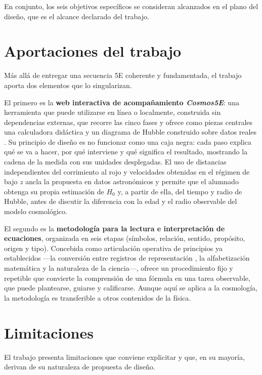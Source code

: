 En conjunto, los seis objetivos específicos se consideran alcanzados en el plano del diseño, que es el alcance declarado del trabajo.

\section{Aportaciones del trabajo}

Más allá de entregar una secuencia 5E coherente y fundamentada, el trabajo aporta dos elementos que lo singularizan.

El primero es la \textbf{web interactiva de acompañamiento \textit{Cosmos5E}}: una herramienta que puede utilizarse en línea o localmente, construida sin dependencias externas, que recorre las cinco fases y ofrece como piezas centrales una calculadora didáctica y un diagrama de Hubble construido sobre datos reales \parencite{steer2017}. Su principio de diseño es no funcionar como una caja negra: cada paso explica qué se va a hacer, por qué interviene y qué significa el resultado, mostrando la cadena de la medida con sus unidades desplegadas. El uso de distancias independientes del corrimiento al rojo y velocidades obtenidas en el régimen de bajo $z$ ancla la propuesta en datos astronómicos y permite que el alumnado obtenga su propia estimación de $H_0$ y, a partir de ella, del tiempo y radio de Hubble, antes de discutir la diferencia con la edad y el radio observable del modelo cosmológico.

El segundo es la \textbf{metodología para la lectura e interpretación de ecuaciones}, organizada en seis etapas (símbolos, relación, sentido, propósito, origen y tipo). Concebida como articulación operativa de principios ya establecidos ---la conversión entre registros de representación \parencite{duval2006}, la alfabetización matemática y la naturaleza de la ciencia---, ofrece un procedimiento fijo y repetible que convierte la comprensión de una fórmula en una tarea observable, que puede plantearse, guiarse y calificarse. Aunque aquí se aplica a la cosmología, la metodología es transferible a otros contenidos de la física.

\section{Limitaciones}

El trabajo presenta limitaciones que conviene explicitar y que, en su mayoría, derivan de su naturaleza de propuesta de diseño.

